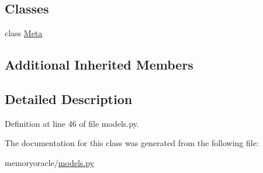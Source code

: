 \subsection*{Classes}
\begin{DoxyCompactItemize}
\item 
class \hyperlink{classmemoryoracle_1_1models_1_1Program_1_1Meta}{Meta}
\end{DoxyCompactItemize}
\subsection*{Additional Inherited Members}


\subsection{Detailed Description}


Definition at line 46 of file models.\+py.



The documentation for this class was generated from the following file\+:\begin{DoxyCompactItemize}
\item 
memoryoracle/\hyperlink{models_8py}{models.\+py}\end{DoxyCompactItemize}
